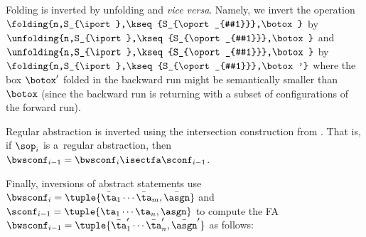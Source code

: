 Folding is inverted by unfolding and \emph{vice versa}. Namely, 
we invert the operation $\folding{n,S_{\iport},\kseq{S_{\oport_{#1}}},\botox}$ by 
$\unfolding{n,S_{\iport},\kseq{S_{\oport_{#1}}},\botox}$ and
$\unfolding{n,S_{\iport},\kseq{S_{\oport_{#1}}},\botox}$ by
$\folding{n,S_{\iport},\kseq{S_{\oport_{#1}}},\botox'}$ where the box $\botox'$ folded in
the backward run might be semantically smaller than $\botox$ (since the
backward run is returning with a subset of configurations of the forward run). 

Regular abstraction is inverted using the intersection construction from . 
That is, if $\sop_i$ is a~regular abstraction, 
then $\bwsconf_{i-1} = \bwsconf_{i} \isectfa\sconf_{i-1}$.

Finally, inversions of abstract statements
use $\bwsconf_{i} = \tuple{\bar\ta_1 \cdots \bar\ta_m, \bar\asgn}$ and
$\sconf_{i-1} = \tuple{\ta_1 \cdots \ta_n, \asgn}$
to
compute the FA $\bwsconf_{i-1} =
\tuple{\bar\ta'_1 \cdots \bar\ta'_n, \bar\asgn'}$
as follows:
%
